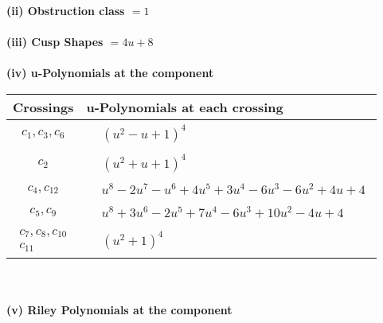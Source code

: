 \documentclass[1p]{elsarticle_modified}
\theoremstyle{definition}
\begin{document}
\flushleft \textbf{(ii) Obstruction class $= 1$}\\~\\
\flushleft \textbf{(iii) Cusp Shapes $= 4 u+8$}\\~\\
\newpage\renewcommand{\arraystretch}{1}
\flushleft \textbf{(iv) u-Polynomials at the component}\newline \\
\begin{tabular}{m{50pt}|m{274pt}}
Crossings & \hspace{64pt}u-Polynomials at each crossing \\
\hline $$\begin{aligned}c_{1},c_{3},c_{6}\end{aligned}$$&$\begin{aligned}
&(u^2- u+1)^4
\end{aligned}$\\
\hline $$\begin{aligned}c_{2}\end{aligned}$$&$\begin{aligned}
&(u^2+u+1)^4
\end{aligned}$\\
\hline $$\begin{aligned}c_{4},c_{12}\end{aligned}$$&$\begin{aligned}
&u^8-2 u^7- u^6+4 u^5+3 u^4-6 u^3-6 u^2+4 u+4
\end{aligned}$\\
\hline $$\begin{aligned}c_{5},c_{9}\end{aligned}$$&$\begin{aligned}
&u^8+3 u^6-2 u^5+7 u^4-6 u^3+10 u^2-4 u+4
\end{aligned}$\\
\hline $$\begin{aligned}c_{7},c_{8},c_{10}\\c_{11}\end{aligned}$$&$\begin{aligned}
&(u^2+1)^4
\end{aligned}$\\
\hline
\end{tabular}\\~\\
\newpage\renewcommand{\arraystretch}{1}
\flushleft \textbf{(v) Riley Polynomials at the component}\newline \\
\end{document}
